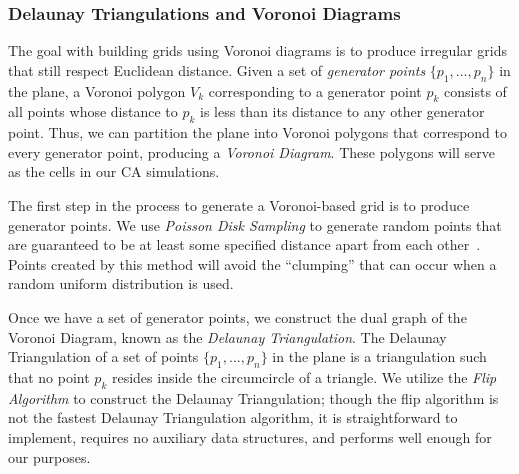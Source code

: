\documentclass[a4paper,11pt]{article}
\begin{document}
\subsubsection{Delaunay Triangulations and Voronoi Diagrams}
The goal with building grids using Voronoi diagrams is to produce irregular grids that still respect Euclidean distance. Given a set of \textit{generator points} $\{p_1, ..., p_n\}$ in the plane, a Voronoi polygon $V_k$ corresponding to a generator point $p_k$ consists of all points whose distance to $p_k$ is less than its distance to any other generator point. Thus, we can partition the plane into Voronoi polygons that correspond to every generator point, producing a \textit{Voronoi Diagram}. These polygons will serve as the cells in our CA simulations.

The first step in the process to generate a Voronoi-based grid is to produce generator points. We use \textit{Poisson Disk Sampling} to generate random points that are guaranteed to be at least some specified distance apart from each other~\cite{br07}. Points created by this method will avoid the ``clumping'' that can occur when a random uniform distribution is used.




Once we have a set of generator points, we construct the dual graph of the Voronoi Diagram, known as the \textit{Delaunay Triangulation}. The Delaunay Triangulation of a set of points $\{p_1, ..., p_n\}$ in the plane is a triangulation such that no point $p_k$ resides inside the circumcircle of a triangle. We utilize the \textit{Flip Algorithm} to construct the Delaunay Triangulation; though the flip algorithm is not the fastest Delaunay Triangulation algorithm, it is straightforward to implement, requires no auxiliary data structures, and performs well enough for our purposes.
\end{document}
